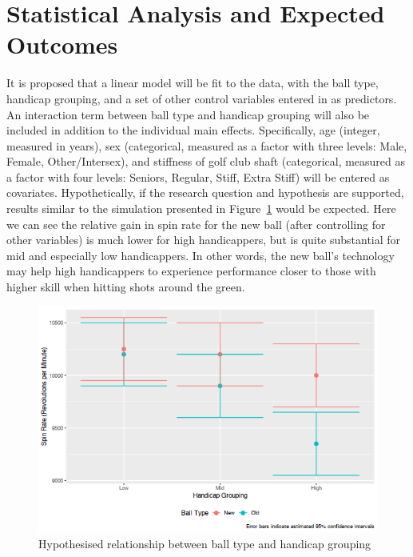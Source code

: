 \documentclass{article}
\begin{document}
\section{Statistical Analysis and Expected Outcomes}
It is proposed that a linear model will be fit to the data, with the ball type, handicap grouping, and a set of other control variables entered in as predictors. 
An interaction term between ball type and handicap grouping will also be included in addition to the individual main effects. 
Specifically, age (integer, measured in years), sex (categorical, measured as a factor with three levels: Male, Female, Other/Intersex), and stiffness of golf club shaft (categorical, measured as a factor with four levels: Seniors, Regular, Stiff, Extra Stiff) will be entered as covariates. 
Hypothetically, if the research question and hypothesis are supported, results similar to the simulation presented in Figure~\ref{fig:expectations} would be expected.
Here we can see the relative gain in spin rate for the new ball (after controlling for other variables) is much lower for high handicappers, but is quite substantial for mid and especially low handicappers. 
In other words, the new ball's technology may help high handicappers to experience performance closer to those with higher skill when hitting shots around the green. 

\begin{figure}[t!]
    \centering
    \includegraphics[max width=\linewidth]{expectations}
    \caption{\label{fig:expectations}Hypothesised relationship between ball type and handicap grouping}
\end{figure}
\end{document}
